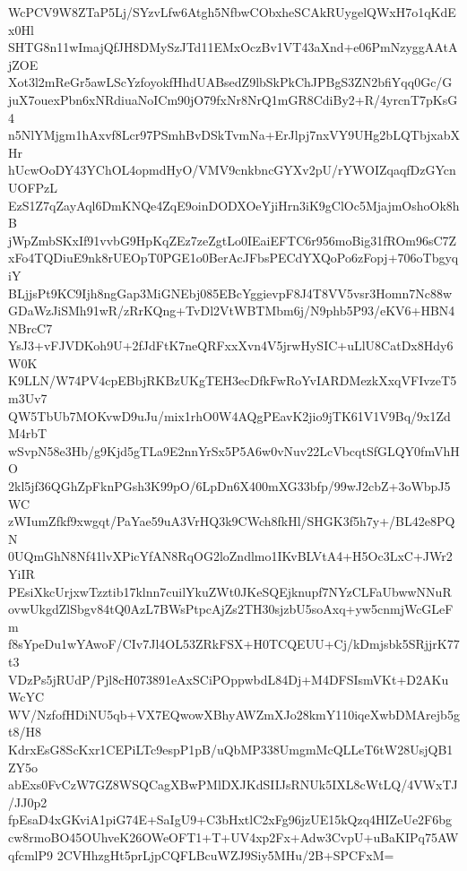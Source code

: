 WcPCV9W8ZTaP5Lj/SYzvLfw6Atgh5NfbwCObxheSCAkRUygelQWxH7o1qKdEx0Hl
SHTG8n11wImajQfJH8DMySzJTd11EMxOczBv1VT43aXnd+e06PmNzyggAAtAjZOE
Xot3l2mReGr5awLScYzfoyokfHhdUABsedZ9lbSkPkChJPBgS3ZN2bfiYqq0Gc/G
juX7ouexPbn6xNRdiuaNoICm90jO79fxNr8NrQ1mGR8CdiBy2+R/4yrcnT7pKsG4
n5NlYMjgm1hAxvf8Lcr97PSmhBvDSkTvmNa+ErJlpj7nxVY9UHg2bLQTbjxabXHr
hUcwOoDY43YChOL4opmdHyO/VMV9cnkbncGYXv2pU/rYWOIZqaqfDzGYcnUOFPzL
EzS1Z7qZayAql6DmKNQe4ZqE9oinDODXOeYjiHrn3iK9gClOc5MjajmOshoOk8hB
jWpZmbSKxIf91vvbG9HpKqZEz7zeZgtLo0IEaiEFTC6r956moBig31fROm96sC7Z
xFo4TQDiuE9nk8rUEOpT0PGE1o0BerAcJFbsPECdYXQoPo6zFopj+706oTbgyqiY
BLjjsPt9KC9Ijh8ngGap3MiGNEbj085EBcYggievpF8J4T8VV5vsr3Homn7Nc88w
GDaWzJiSMh91wR/zRrKQng+TvDl2VtWBTMbm6j/N9phb5P93/eKV6+HBN4NBrcC7
YsJ3+vFJVDKoh9U+2fJdFtK7neQRFxxXvn4V5jrwHySIC+uLlU8CatDx8Hdy6W0K
K9LLN/W74PV4cpEBbjRKBzUKgTEH3ecDfkFwRoYvIARDMezkXxqVFIvzeT5m3Uv7
QW5TbUb7MOKvwD9uJu/mix1rhO0W4AQgPEavK2jio9jTK61V1V9Bq/9x1ZdM4rbT
wSvpN58e3Hb/g9Kjd5gTLa9E2nnYrSx5P5A6w0vNuv22LcVbcqtSfGLQY0fmVhHO
2kl5jf36QGhZpFknPGsh3K99pO/6LpDn6X400mXG33bfp/99wJ2cbZ+3oWbpJ5WC
zWIumZfkf9xwgqt/PaYae59uA3VrHQ3k9CWch8fkHl/SHGK3f5h7y+/BL42e8PQN
0UQmGhN8Nf41lvXPicYfAN8RqOG2loZndlmo1IKvBLVtA4+H5Oc3LxC+JWr2YiIR
PEsiXkcUrjxwTzztib17klnn7cuilYkuZWt0JKeSQEjknupf7NYzCLFaUbwwNNuR
ovwUkgdZlSbgv84tQ0AzL7BWsPtpcAjZs2TH30sjzbU5soAxq+yw5cnmjWcGLeFm
f8sYpeDu1wYAwoF/CIv7Jl4OL53ZRkFSX+H0TCQEUU+Cj/kDmjsbk5SRjjrK77t3
VDzPs5jRUdP/Pjl8cH073891eAxSCiPOppwbdL84Dj+M4DFSIsmVKt+D2AKuWcYC
WV/NzfofHDiNU5qb+VX7EQwowXBhyAWZmXJo28kmY110iqeXwbDMArejb5gt8/H8
KdrxEsG8ScKxr1CEPiLTc9espP1pB/uQbMP338UmgmMcQLLeT6tW28UsjQB1ZY5o
abExs0FvCzW7GZ8WSQCagXBwPMlDXJKdSIIJsRNUk5IXL8cWtLQ/4VWxTJ/JJ0p2
fpEsaD4xGKviA1piG74E+SaIgU9+C3bHxtlC2xFg96jzUE15kQzq4HIZeUe2F6bg
cw8rmoBO45OUhveK26OWeOFT1+T+UV4xp2Fx+Adw3CvpU+uBaKIPq75AWqfcmlP9
2CVHhzgHt5prLjpCQFLBcuWZJ9Siy5MHu/2B+SPCFxM=
